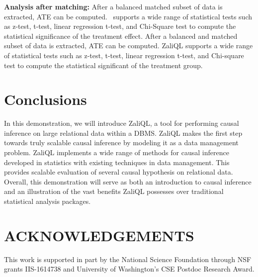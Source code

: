 {\bf Analysis after matching:}
After a balanced matched subset of data is extracted,
ATE can be computed. \GSQL\  supports a wide range of statistical
tests such as z-test, t-test, linear regression t-test, and Chi-Square test
to compute the statistical significance of the treatment effect.
After a balanced and matched subset of data is extracted, ATE can be computed. ZaliQL supports a wide range of statistical tests such as z-test, t-test, linear regression t-test, and Chi-square test to compute the statistical significant of the treatment group.


\section{Conclusions}
In this demonstration, we will introduce ZaliQL, a tool for performing causal inference on large relational data within a DBMS. ZaliQL makes the first step towards truly scalable causal inference by modeling it as a data management problem. ZaliQL implements a wide range of methods for causal inference developed in statistics with existing techniques in data management. This provides scalable evaluation of several causal hypothesis on relational data. Overall, this demonstration will serve as both an introduction to causal inference and an illustration of the vast benefits ZaliQL possesses over traditional statistical analysis packages.


\section{ACKNOWLEDGEMENTS}
This work is supported in part by the National Science Foundation through NSF grants IIS-1614738 and
University of Washington's CSE Postdoc Research Award.





